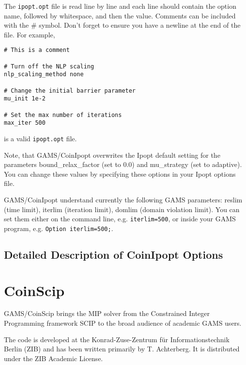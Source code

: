 The \texttt{ipopt.opt} file is read line by line and each line should contain the option name, followed by whitespace, and then the value.
Comments can be included with the \# symbol. Don't forget to ensure you have a newline at the end of the file. For example,
\begin{verbatim}
# This is a comment

# Turn off the NLP scaling
nlp_scaling_method none

# Change the initial barrier parameter
mu_init 1e-2

# Set the max number of iterations
max_iter 500
\end{verbatim}
is a valid \texttt{ipopt.opt} file.


Note, that GAMS/CoinIpopt overwrites the Ipopt default setting for the parameters bound\_relax\_factor (set to 0.0) and mu\_strategy (set to adaptive).
You can change these values by specifying these options in your Ipopt options file.

GAMS/CoinIpopt understand currently the following GAMS parameters: reslim (time limit), iterlim (iteration limit), domlim (domain violation limit).
You can set them either on the command line, e.g. \verb+iterlim=500+, or inside your GAMS program, e.g. \verb+Option iterlim=500;+.

\subsection{Detailed Description of CoinIpopt Options}
\label{sub:ipoptoptions}



\section{CoinScip}

GAMS/CoinScip brings the MIP solver from the Constrained Integer Programming framework SCIP to the broad audience of academic GAMS users.

The code is developed at the Konrad-Zuse-Zentrum f\"ur Informationstechnik Berlin (ZIB) and has been written primarily by T. Achterberg.
It is distributed under the ZIB Academic License.

